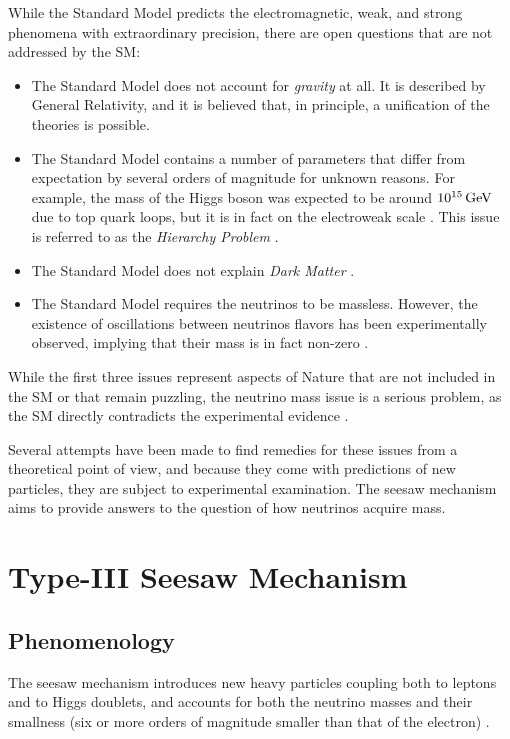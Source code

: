 While the Standard Model predicts the electromagnetic, weak, and strong phenomena with extraordinary precision, there are open questions that are not addressed by the SM:
\begin{itemize}
	\item The Standard Model does not account for \textit{gravity} at all. It is described by General Relativity, and it is believed that, in principle, a unification of the theories is possible.
	\item The Standard Model contains a number of parameters that differ from expectation by several orders of magnitude for unknown reasons. For example, the mass of the Higgs boson was expected to be around $10^{15}\,\text{Ge\hspace{-.08em}V}$ due to top quark loops, but it is in fact on the electroweak scale \cite{Aad:2015zhl}. This issue is referred to as the \textit{Hierarchy Problem} \cite{Martin:1997ns}.
	\item The Standard Model does not explain \textit{Dark Matter} \cite{Pomarol:2012sb}.
	\item The Standard Model requires the neutrinos to be massless. However, the existence of oscillations between neutrinos flavors has been experimentally observed, implying that their mass is in fact non-zero \cite{PhysRevD.22.2227,Fukuda:1998fd,Nustatus}.
\end{itemize}

While the first three issues represent aspects of Nature that are not included in the SM or that remain puzzling, the neutrino mass issue is a serious problem, as the SM directly contradicts the experimental evidence \cite{Fukuda:1998fd}.

Several attempts have been made to find remedies for these issues from a theoretical point of view, and because they come with predictions of new particles, they are subject to experimental examination. The seesaw mechanism aims to provide answers to the question of how neutrinos acquire mass. 

\section{Type-III Seesaw Mechanism}
\subsection{Phenomenology}
\label{sec:Theory/SeesawPhenomenology}

The seesaw mechanism introduces new heavy particles coupling both to leptons and to Higgs doublets, and accounts for both the neutrino masses and their smallness (six or more orders of magnitude smaller than that of the electron) \cite{SeesawI,typeIa,typeIb,typeIe,typeIIa,typeIIb,typeIIc,typeIId,typeIIe,SeesawIII:a,Seesawinverse}.

